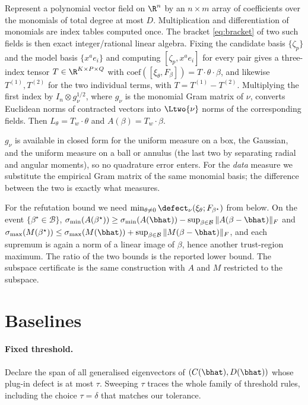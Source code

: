 Represent a polynomial vector field on $\R^n$ by an $n \times m$ array of
coefficients over the monomials of total degree at most $D$. Multiplication and
differentiation of monomials are index tables computed once. The bracket
\eqref{eq:bracket} of two such fields is then exact integer/rational linear
algebra. Fixing the candidate basis $\{\zeta_p\}$ and the model basis
$\{x^a e_i\}$ and computing $[\zeta_p, x^a e_i]$ for every pair gives a
three-index tensor $T \in \R^{K \times P \times Q}$ with
$\mathrm{coef}([\xi_\theta,F_\beta]) = T \cdot \theta \cdot \beta$, and likewise
$T^{(1)}, T^{(2)}$ for the two individual terms, with $T = T^{(1)}-T^{(2)}$.
Multiplying the first index by $I_n \otimes g_\nu^{1/2}$, where $g_\nu$ is the
monomial Gram matrix of $\nu$, converts Euclidean norms of contracted vectors
into $\Ltwo{\nu}$ norms of the corresponding fields. Then
$L_\theta = T_w \cdot \theta$ and $A(\beta) = T_w \cdot \beta$.

$g_\nu$ is available in closed form for the uniform measure on a box, the
Gaussian, and the uniform measure on a ball or annulus (the last two by
separating radial and angular moments), so no quadrature error enters. For the
\emph{data} measure we substitute the empirical Gram matrix of the same monomial
basis; the difference between the two is exactly what 
measures.

For the refutation bound we need
$\min_{\theta \ne 0}\defect_\nu(\xi_\theta;F_{\beta^\star})$ from below.
On the event $\{\beta^\star \in \mathcal B\}$,
$\sigma_{\min}(A(\beta^\star)) \ge \sigma_{\min}(A(\bhat)) -
\sup_{\beta \in \mathcal B}\|A(\beta - \bhat)\|_F$ and
$\sigma_{\max}(M(\beta^\star)) \le \sigma_{\max}(M(\bhat)) +
\sup_{\beta \in \mathcal B}\|M(\beta-\bhat)\|_F$, and each supremum is again a
norm of a linear image of $\beta$, hence another trust-region maximum. The
ratio of the two bounds is the reported lower bound. The subspace certificate
is the same construction with $A$ and $M$ restricted to the subspace.

\section{Baselines}
\label{app:baselines}

\paragraph{Fixed threshold.} Declare the span of all generalised eigenvectors of
$(C(\bhat), D(\bhat))$ whose plug-in defect is at most $\tau$. Sweeping $\tau$
traces the whole family of threshold rules, including the choice $\tau = \delta$
that matches our tolerance.

